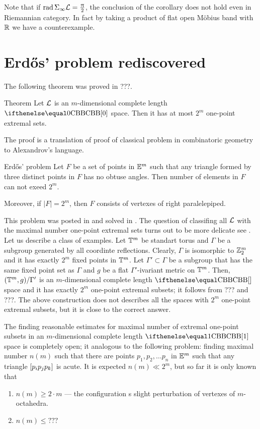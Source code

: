 Note that if $\mathop{\rm rad}\nolimits\Sigma_\infty \mathcal{L}=\tfrac{\uppi}2$, the conclusion of the corollary does not hold even in Riemannian category.
In fact by taking a product of flat open M\"obius band with $\mathbb{R}$ we have a counterexample.



\section{Erd\H{o}s' problem rediscovered}

The following theorem was proved in ???.

\begin{thm}{Theorem}\label{thm:extr-point}
Let $\mathcal{L}$ is an $m$-dimensional complete length $\Alex0$ space.
Then it has at most $2^m$ one-point extremal sets.
\end{thm}


The proof is a translation of proof of classical problem in combinatoric geometry to Alexandrov's language.

\begin{thm}{Erd\H{o}s' problem}
Let $F$ be a set of points in $\mathbb{E}^m$ such that any triangle formed by three distinct points in $F$ has no obtuse angles.
Then number of elements in $F$ can not exeed $2^m$.

Moreover, if $|F|=2^m$, then $F$ consists of vertexes of right paralelepiped.
\end{thm}

This problem was posted in \cite{erdos} and solved in \cite{danzer-gruenbaum}.
The question of classifing all $\mathcal{L}$ with the maximal number one-point extremal sets turns out to be more delicate see \cite{lebedeva}.
Let us describe a class of examples.
Let $\mathbb{T}^m$ be standart torus 
and $\Gamma$ be a subgroup generated by all coordinte reflections.
Clearly, $\Gamma$ is isomorphic to $\mathbb{Z}_2^m$ and it has exactly $2^m$ fixed points in $\mathbb{T}^m$.
Let $\Gamma'\subset\Gamma$ be a subgroup that has the same fixed point set as $\Gamma$ 
and $g$ be a flat $\Gamma'$-ivariant metric on $\mathbb{T}^m$.
Then, $(\mathbb{T}^m,g)/\Gamma'$ is an $m$-dimensional complete length $\Alex{}$ space and it has exactly $2^m$ one-point extremal subsets; it follows from ??? and ???.
The above construction does not describes all the spaces with $2^m$ one-point extremal subsets, but it is close to the correct answer.

The finding reasonable estimates for maximal number of extremal one-point subsets in an $m$-dimensional complete length $\Alex{1}$ space is completely open;
it analogous to the following problem: finding maximal number $n(m)$ such that there are points $p_1,p_2,\dots p_n$ in $\mathbb{E}^m$ such that any triangle $\trig{p_i}{p_j}{p_\kay}$ is acute.
It is expected $n(m)\ll 2^m$, but so far it is only known that 
\begin{enumerate}
\item $n(m)\ge 2\cdot m$ --- the configuration s slight perturbation of vertexes of $m$-octahedra.
\item $n(m)\le ???$
\end{enumerate}


